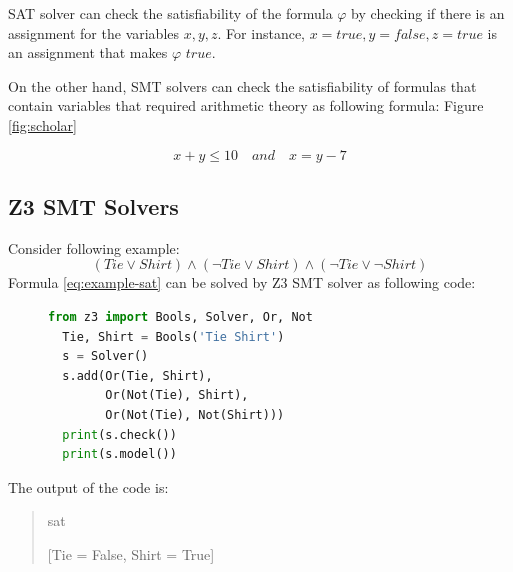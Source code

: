 \documentclass[]{rptuseminar}
\newenvironment{displayshellcommand}{%
	\begin{quote}%
	\ttfamily%
}{%
	\end{quote}%
}
\begin{document}
SAT solver can check the satisfiability of the formula \(\varphi\) by checking if there is an assignment for the variables \(x, y, z\).
For instance, \(x = true, y = false, z = true\) is an assignment that makes \(\varphi\) \(true\). 

On the other hand, SMT solvers can check the satisfiability of formulas that contain variables that required arithmetic theory as following formula:
Figure \ref{fig:scholar}

\begin{equation}
  x + y \leq 10 \quad and \quad x = y - 7
\end{equation}

\subsection{Z3 SMT Solvers}

Consider following example:
\begin{equation}
  \label{eq:example-sat}
  (Tie \lor Shirt) \land (\lnot Tie \lor Shirt) \land (\lnot Tie \lor \lnot Shirt)
\end{equation}
Formula \ref{eq:example-sat} can be solved by Z3 SMT solver as following code:

\begin{figure}[ht]
\begin{lstlisting}[language=Python]
  from z3 import Bools, Solver, Or, Not
  Tie, Shirt = Bools('Tie Shirt')
  s = Solver()
  s.add(Or(Tie, Shirt),
        Or(Not(Tie), Shirt),
        Or(Not(Tie), Not(Shirt)))
  print(s.check())
  print(s.model())
\end{lstlisting}
\end{figure}
The output of the code is:

\begin{displayshellcommand}
sat

[Tie = False, Shirt = True]
\end{displayshellcommand}
\end{document}

